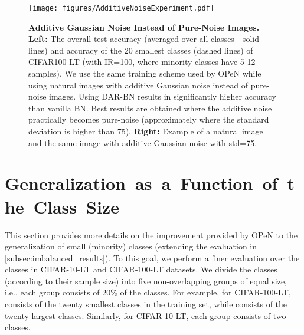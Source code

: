 \documentclass[nohyperref]{article}
\theoremstyle{plain}
\theoremstyle{definition}
\theoremstyle{remark}
\begin{document}
\begin{figure}[h!]
    \centering
    \vspace*{-0.42cm}
    \texttt{[image: figures/AdditiveNoiseExperiment.pdf]}
\vspace*{-0.42cm}
    \caption{\textbf{Additive Gaussian Noise Instead of Pure-Noise Images.} \textbf{Left:} The overall test accuracy (averaged over all classes - solid lines) and accuracy of the 20 smallest classes (dashed lines) of {CIFAR100-LT} (with IR=100, where minority classes have 5-12 samples). We use the same training scheme used by OPeN while using natural images with additive Gaussian noise instead of pure-noise images. Using DAR-BN results in significantly higher accuracy than vanilla BN. Best results are obtained where the additive noise practically becomes pure-noise (approximately where the standard deviation is higher than 75). \textbf{Right:} Example of a natural image and the same image with additive Gaussian noise with std=75.}
    \label{fig:pure_noise_verses_additive_noise}
\end{figure}



\section{\mbox{\bf {Generalization as a Function of the Class Size}}}\label{appendix:Generalization_class_size}
\vspace*{-0.15cm}
This section provides more details on the improvement provided by OPeN to the generalization of small (minority) classes (extending the evaluation in \cref{subsec:imbalanced_results}). To this goal, we perform a finer evaluation over the classes in CIFAR-10-LT and CIFAR-100-LT datasets. We divide the classes (according to their sample size) into five non-overlapping groups of equal size, i.e., each group consists of 20\% of the classes. For example, for CIFAR-100-LT, \textit{} consists of the twenty smallest classes in the training set, while \textit{} consists of the twenty largest classes. Similarly, for CIFAR-10-LT, each group consists of two classes.
\end{document}
